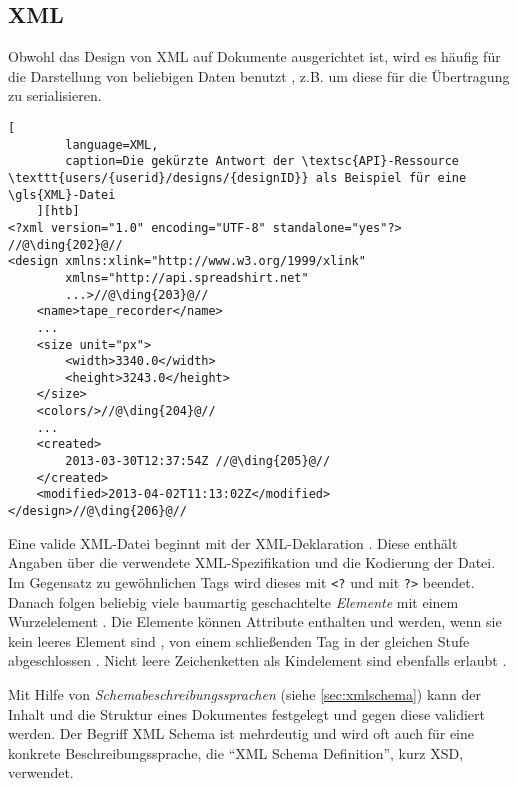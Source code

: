 \subsection{XML}
\label{sec:xml}


Obwohl das Design von \gls{XML} auf Dokumente ausgerichtet ist, wird es häufig für die Darstellung von beliebigen Daten benutzt \cite{wiki:xml}, z.B. um diese für die Übertragung zu serialisieren.

\begin{lstlisting}[
        language=XML, 
        caption=Die gekürzte Antwort der \textsc{API}-Ressource \texttt{users/{userid}/designs/{designID}} als Beispiel für eine \gls{XML}-Datei
    ][htb]
<?xml version="1.0" encoding="UTF-8" standalone="yes"?> //@\ding{202}@//
<design xmlns:xlink="http://www.w3.org/1999/xlink" 
        xmlns="http://api.spreadshirt.net" 
        ...>//@\ding{203}@//
    <name>tape_recorder</name>
    ...
    <size unit="px">
        <width>3340.0</width>
        <height>3243.0</height>
    </size>
    <colors/>//@\ding{204}@//
    ...
    <created>
        2013-03-30T12:37:54Z //@\ding{205}@//
    </created>
    <modified>2013-04-02T11:13:02Z</modified>
</design>//@\ding{206}@//
\end{lstlisting}

Eine valide \gls{XML}-Datei beginnt mit der \gls{XML}-Deklaration . Diese enthält Angaben über die verwendete \gls{XML}-Spezifikation und die Kodierung der Datei. 
Im Gegensatz zu gewöhnlichen Tags wird dieses mit \texttt{<?} und mit \texttt{?>} beendet. 
Danach folgen beliebig viele baumartig geschachtelte \emph{Elemente} mit einem Wurzelelement . Die Elemente können Attribute enthalten und werden, wenn sie kein leeres Element sind , von einem schließenden Tag in der gleichen Stufe abgeschlossen . Nicht leere Zeichenketten als Kindelement sind ebenfalls erlaubt .

Mit Hilfe von \emph{Schemabeschreibungssprachen} (siehe \cref{sec:xmlschema}) kann der Inhalt und die Struktur eines Dokumentes festgelegt und gegen diese validiert werden. Der Begriff \gls{XML} Schema ist mehrdeutig und wird oft auch für eine konkrete Beschreibungssprache, die \enquote{\gls{XML} Schema Definition}, kurz \gls{XSD}, verwendet.
